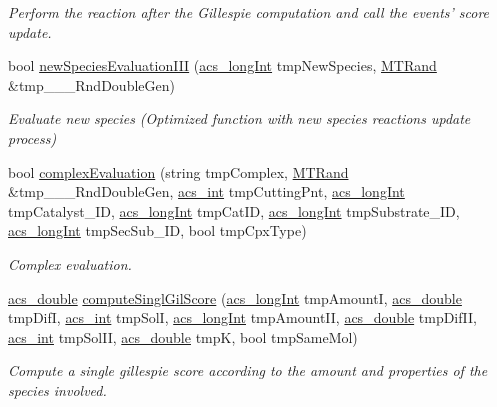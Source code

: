 \begin{DoxyCompactItemize}
\begin{DoxyCompactList}\small\item\em Perform the reaction after the Gillespie computation and call the events' score update. \end{DoxyCompactList}\item 
bool \hyperlink{a00011_a4fe7891fb38f3f25bb82769af0ddfe19}{new\-Species\-Evaluation\-I\-I\-I} (\hyperlink{a00024_a19319d75f02db4308bc5c0026d98cd85}{acs\-\_\-long\-Int} tmp\-New\-Species, \hyperlink{a00016}{M\-T\-Rand} \&tmp\-\_\-\-\_\-\-\_\-\-Rnd\-Double\-Gen)
\begin{DoxyCompactList}\small\item\em Evaluate new species (Optimized function with new species reactions update process) \end{DoxyCompactList}\item 
bool \hyperlink{a00011_a5ee6b203f077de1467aa72042814db7d}{complex\-Evaluation} (string tmp\-Complex, \hyperlink{a00016}{M\-T\-Rand} \&tmp\-\_\-\-\_\-\-\_\-\-Rnd\-Double\-Gen, \hyperlink{a00024_a8d277355641a098190360234e2ebde35}{acs\-\_\-int} tmp\-Cutting\-Pnt, \hyperlink{a00024_a19319d75f02db4308bc5c0026d98cd85}{acs\-\_\-long\-Int} tmp\-Catalyst\-\_\-\-I\-D, \hyperlink{a00024_a19319d75f02db4308bc5c0026d98cd85}{acs\-\_\-long\-Int} tmp\-Cat\-I\-D, \hyperlink{a00024_a19319d75f02db4308bc5c0026d98cd85}{acs\-\_\-long\-Int} tmp\-Substrate\-\_\-\-I\-D, \hyperlink{a00024_a19319d75f02db4308bc5c0026d98cd85}{acs\-\_\-long\-Int} tmp\-Sec\-Sub\-\_\-\-I\-D, bool tmp\-Cpx\-Type)
\begin{DoxyCompactList}\small\item\em Complex evaluation. \end{DoxyCompactList}\item 
\hyperlink{a00024_ab776853a005fcbf56af0424a2a4dd607}{acs\-\_\-double} \hyperlink{a00011_ae1270b9c235dd6b28413075197dba8e0}{compute\-Singl\-Gil\-Score} (\hyperlink{a00024_a19319d75f02db4308bc5c0026d98cd85}{acs\-\_\-long\-Int} tmp\-Amount\-I, \hyperlink{a00024_ab776853a005fcbf56af0424a2a4dd607}{acs\-\_\-double} tmp\-Dif\-I, \hyperlink{a00024_a8d277355641a098190360234e2ebde35}{acs\-\_\-int} tmp\-Sol\-I, \hyperlink{a00024_a19319d75f02db4308bc5c0026d98cd85}{acs\-\_\-long\-Int} tmp\-Amount\-I\-I, \hyperlink{a00024_ab776853a005fcbf56af0424a2a4dd607}{acs\-\_\-double} tmp\-Dif\-I\-I, \hyperlink{a00024_a8d277355641a098190360234e2ebde35}{acs\-\_\-int} tmp\-Sol\-I\-I, \hyperlink{a00024_ab776853a005fcbf56af0424a2a4dd607}{acs\-\_\-double} tmp\-K, bool tmp\-Same\-Mol)
\begin{DoxyCompactList}\small\item\em Compute a single gillespie score according to the amount and properties of the species involved. \end{DoxyCompactList}\item 

\end{DoxyCompactItemize}
